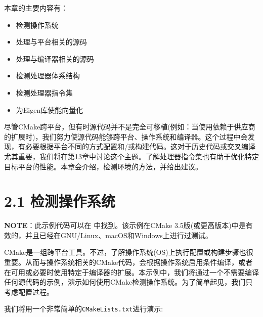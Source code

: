 本章的主要内容有：

\begin{itemize}
\item 检测操作系统

\item 处理与平台相关的源码

\item 处理与编译器相关的源码

\item 检测处理器体系结构

\item 检测处理器指令集

\item 为Eigen库使能向量化

\end{itemize}

尽管CMake跨平台，但有时源代码并不是完全可移植(例如：当使用依赖于供应商的扩展时)，我们努力使源代码能够跨平台、操作系统和编译器。这个过程中会发现，有必要根据平台不同的方式配置和/或构建代码。这对于历史代码或交叉编译尤其重要，我们将在第13章中讨论这个主题。了解处理器指令集也有助于优化特定目标平台的性能。本章会介绍，检测环境的方法，并给出建议。


\section{2.1 检测操作系统}

\begin{myInfoBox}
\textbf{NOTE}：此示例代码可以在  中找到。该示例在CMake 3.5版(或更高版本)中是有效的，并且已经在GNU/Linux、macOS和Windows上进行过测试。
\end{myInfoBox}

CMake是一组跨平台工具。不过，了解操作系统(OS)上执行配置或构建步骤也很重要。从而与操作系统相关的CMake代码，会根据操作系统启用条件编译，或者在可用或必要时使用特定于编译器的扩展。本示例中，我们将通过一个不需要编译任何源代码的示例，演示如何使用CMake检测操作系统。为了简单起见，我们只考虑配置过程。


我们将用一个非常简单的\texttt{CMakeLists.txt}进行演示:

